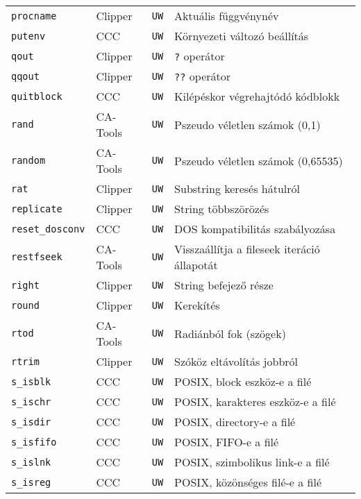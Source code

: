 \begin{tabular}{|l|l|l|l|}
\verb!procname!                    & Clipper  &  {\tt UW} & Aktuális függvénynév\\
\verb!putenv!                      & CCC      &  {\tt UW} & Környezeti változó beállítás\\
\verb!qout!                        & Clipper  &  {\tt UW} & \verb!?! operátor\\ 
\verb!qqout!                       & Clipper  &  {\tt UW} & \verb!??! operátor\\
\verb!quitblock!                   & CCC      &  {\tt UW} & Kilépéskor végrehajtódó kódblokk\\
\verb!rand!                        & CA-Tools &  {\tt UW} & Pszeudo véletlen számok (0,1)\\ 
\verb!random!                      & CA-Tools &  {\tt UW} & Pszeudo véletlen számok (0,65535)\\
\verb!rat!                         & Clipper  &  {\tt UW} & Substring keresés hátulról\\
\verb!replicate!                   & Clipper  &  {\tt UW} & String többszörözés\\
\verb!reset_dosconv!               & CCC      &  {\tt UW} & DOS kompatibilitás szabályozása\\
\verb!restfseek!                   & CA-Tools &  {\tt UW} & Visszaállítja a fileseek iteráció állapotát\\
\verb!right!                       & Clipper  &  {\tt UW} & String befejező része\\
\verb!round!                       & Clipper  &  {\tt UW} & Kerekítés\\
\verb!rtod!                        & CA-Tools &  {\tt UW} & Radiánból fok (szögek)\\
\verb!rtrim!                       & Clipper  &  {\tt UW} & Szóköz eltávolítás jobbról\\
\verb!s_isblk!                     & CCC      &  {\tt UW} & POSIX, block eszköz-e a filé\\
\verb!s_ischr!                     & CCC      &  {\tt UW} & POSIX, karakteres eszköz-e a filé\\
\verb!s_isdir!                     & CCC      &  {\tt UW} & POSIX, directory-e a filé\\
\verb!s_isfifo!                    & CCC      &  {\tt UW} & POSIX, FIFO-e a filé\\
\verb!s_islnk!                     & CCC      &  {\tt UW} & POSIX, szimbolikus link-e a filé\\
\verb!s_isreg!                     & CCC      &  {\tt UW} & POSIX, közönséges filé-e a filé\\

\end{tabular}
